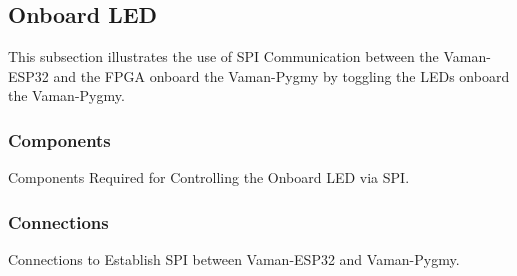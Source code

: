 \subsection{Onboard LED}
This subsection illustrates the use of SPI Communication between the Vaman-ESP32
and the FPGA onboard the Vaman-Pygmy by toggling the LEDs onboard the
Vaman-Pygmy.

\subsubsection{Components}
\begin{table}[!ht]
    \centering
    
    \caption{Components Required for Controlling the Onboard LED via SPI.}
    \label{tab:esp32-fpga-led-components}
\end{table}

\subsubsection{Connections}
\begin{table}[!ht]
    \centering
    
    \caption{Connections to Establish SPI between Vaman-ESP32 and Vaman-Pygmy.}
    \label{tab:esp32-fpga-led-connections}
\end{table}

